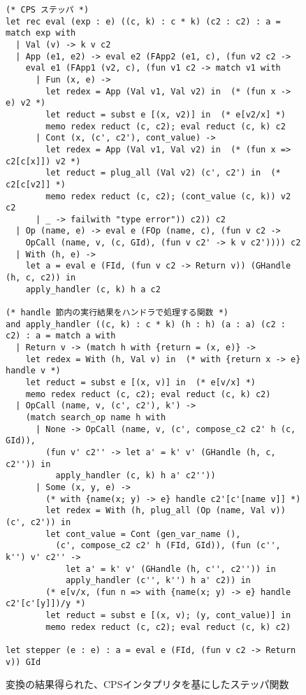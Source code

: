 \begin{figure}
\begin{spacing}{0.8}
\begin{verbatim}
(* CPS ステッパ *)
let rec eval (exp : e) ((c, k) : c * k) (c2 : c2) : a = match exp with
  | Val (v) -> k v c2
  | App (e1, e2) -> eval e2 (FApp2 (e1, c), (fun v2 c2 ->
    eval e1 (FApp1 (v2, c), (fun v1 c2 -> match v1 with
      | Fun (x, e) ->
        let redex = App (Val v1, Val v2) in  (* (fun x -> e) v2 *)
        let reduct = subst e [(x, v2)] in  (* e[v2/x] *)
        memo redex reduct (c, c2); eval reduct (c, k) c2
      | Cont (x, (c', c2'), cont_value) ->
        let redex = App (Val v1, Val v2) in  (* (fun x => c2[c[x]]) v2 *)
        let reduct = plug_all (Val v2) (c', c2') in  (* c2[c[v2]] *)
        memo redex reduct (c, c2); (cont_value (c, k)) v2 c2
      | _ -> failwith "type error")) c2)) c2
  | Op (name, e) -> eval e (FOp (name, c), (fun v c2 ->
    OpCall (name, v, (c, GId), (fun v c2' -> k v c2')))) c2
  | With (h, e) ->
    let a = eval e (FId, (fun v c2 -> Return v)) (GHandle (h, c, c2)) in
    apply_handler (c, k) h a c2

(* handle 節内の実行結果をハンドラで処理する関数 *)
and apply_handler ((c, k) : c * k) (h : h) (a : a) (c2 : c2) : a = match a with
  | Return v -> (match h with {return = (x, e)} ->
    let redex = With (h, Val v) in  (* with {return x -> e} handle v *)
    let reduct = subst e [(x, v)] in  (* e[v/x] *)
    memo redex reduct (c, c2); eval reduct (c, k) c2)
  | OpCall (name, v, (c', c2'), k') ->
    (match search_op name h with
      | None -> OpCall (name, v, (c', compose_c2 c2' h (c, GId)),
        (fun v' c2'' -> let a' = k' v' (GHandle (h, c, c2'')) in
          apply_handler (c, k) h a' c2''))
      | Some (x, y, e) ->
        (* with {name(x; y) -> e} handle c2'[c'[name v]] *)
        let redex = With (h, plug_all (Op (name, Val v)) (c', c2')) in
        let cont_value = Cont (gen_var_name (),
          (c', compose_c2 c2' h (FId, GId)), (fun (c'', k'') v' c2'' ->
            let a' = k' v' (GHandle (h, c'', c2'')) in
            apply_handler (c'', k'') h a' c2)) in
        (* e[v/x, (fun n => with {name(x; y) -> e} handle c2'[c'[y]])/y *)
        let reduct = subst e [(x, v); (y, cont_value)] in
        memo redex reduct (c, c2); eval reduct (c, k) c2)

let stepper (e : e) : a = eval e (FId, (fun v c2 -> Return v)) GId
\end{verbatim}
\end{spacing}
\caption{変換の結果得られた、CPSインタプリタを基にしたステッパ関数}
\label{figure:6cps}
\end{figure}


